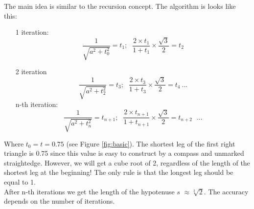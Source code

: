 \documentclass[12pt, letterpaper, oneside]{report}
\begin{document}
The main idea is similar to the recursion concept. 
The algorithm is looks like this:
\begin{enumerate}
\item[1] iteration:
\begin{equation}
\dfrac{1}{\sqrt{a^{2}+t_{0}^{2}}}=t_{1};\ \hspace{5pt} \frac{2\times t_{1}}{1+t_{1}}\times\frac{\sqrt{3}}{2}=t_{2}
\end{equation}
\item[2] iteration
\begin{equation}
 \dfrac{1}{\sqrt{a^{2}+t_{2}^{2}}}=t_{3};\ \hspace{5pt} \frac{2\times t_{3}}{1+t_{3}}\times\frac{\sqrt{3}}{2}=t_{4} \ ...
\end{equation}
\subitem n-th iteration:
\begin{equation}
\dfrac{1}{\sqrt{a^{2}+t_{n}^{2}}}=t_{n+1};\ \hspace{5pt} \frac{2\times t_{n+1}}{1+t_{n+1}}\times\frac{\sqrt{3}}{2}=t_{n+2} \ \hspace{5pt} ...
\end{equation}
\end{enumerate}
Where $t_{0}=t=0.75$ (see Figure \ref{fig:basic}). The shortest leg of the first right triangle is 0.75 since this value is easy to construct by a compass and unmarked straightedge.
However, we will get a cube root of 2, regardless of the length of the shortest leg at the beginning! The only rule is that the longest leg  should be equal to 1.
\\ 
After n-th iterations we get the length of the hypotenuse $s$
 $\approx\sqrt[3]{2}$. The accuracy depends on the number of iterations.\\ 
\end{document}
